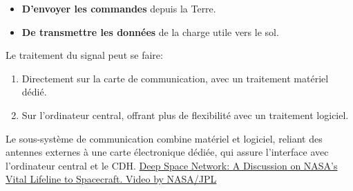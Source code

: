 \begin{itemize}
    \item \textbf{D'envoyer les commandes} depuis la Terre.
    \item \textbf{De transmettre les données} de la charge utile vers le sol.
\end{itemize}
Le traitement du signal peut se faire:
\begin{enumerate}
    \item Directement sur la carte de communication, avec un traitement matériel dédié.
    \item Sur l’ordinateur central, offrant plus de flexibilité avec un traitement logiciel.
\end{enumerate}
Le sous-système de communication combine matériel et logiciel, reliant des antennes externes à une carte électronique dédiée, qui assure l'interface avec l’ordinateur central et le CDH.
\href{https://www.youtube.com/watch?v=NGgzq8eXZOQ&feature=youtu.be}{Deep Space Network: A Discussion on NASA’s Vital Lifeline to Spacecraft. Video by NASA/JPL}
